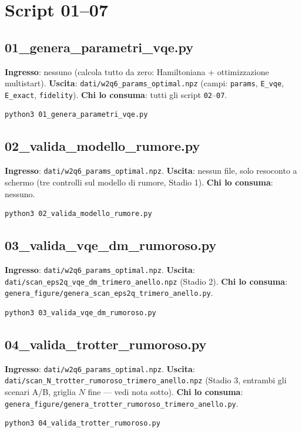 \documentclass[11pt,a4paper]{article}
\begin{document}
\section{Script 01--07}

\subsection{01\_genera\_parametri\_vqe.py}
\textbf{Ingresso}: nessuno (calcola tutto da zero: Hamiltoniana +
ottimizzazione multistart). \textbf{Uscita}:
\texttt{dati/w2q6\_params\_optimal.npz} (campi: \texttt{params},
\texttt{E\_vqe}, \texttt{E\_exact}, \texttt{fidelity}). \textbf{Chi lo
consuma}: tutti gli script \texttt{02}--\texttt{07}.
\begin{verbatim}
python3 01_genera_parametri_vqe.py
\end{verbatim}

\subsection{02\_valida\_modello\_rumore.py}
\textbf{Ingresso}: \texttt{dati/w2q6\_params\_optimal.npz}.
\textbf{Uscita}: nessun file, solo resoconto a schermo (tre controlli
sul modello di rumore, Stadio 1). \textbf{Chi lo consuma}: nessuno.
\begin{verbatim}
python3 02_valida_modello_rumore.py
\end{verbatim}

\subsection{03\_valida\_vqe\_dm\_rumoroso.py}
\textbf{Ingresso}: \texttt{dati/w2q6\_params\_optimal.npz}.
\textbf{Uscita}: \texttt{dati/scan\_eps2q\_\allowbreak vqe\_dm\_trimero\_anello.npz}
(Stadio 2). \textbf{Chi lo consuma}:
\texttt{genera\_figure/\allowbreak genera\_scan\_eps2q\_\allowbreak trimero\_anello.py}.
\begin{verbatim}
python3 03_valida_vqe_dm_rumoroso.py
\end{verbatim}

\subsection{04\_valida\_trotter\_rumoroso.py}
\textbf{Ingresso}: \texttt{dati/w2q6\_params\_optimal.npz}.
\textbf{Uscita}:
\texttt{dati/scan\_N\_trotter\_\allowbreak rumoroso\_trimero\_anello.npz} (Stadio 3,
entrambi gli scenari A/B, griglia $N$ fine --- vedi nota sotto).
\textbf{Chi lo consuma}:
\texttt{genera\_figure/\allowbreak genera\_trotter\_\allowbreak rumoroso\_trimero\_anello.py}.
\begin{verbatim}
python3 04_valida_trotter_rumoroso.py
\end{verbatim}
\end{document}

